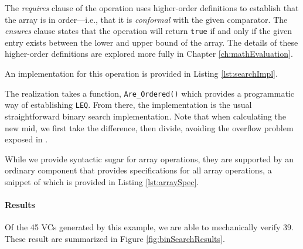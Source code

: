 The \emph{requires} clause of the operation uses higher-order definitions to establish that the array is in order---i.e., that it is \emph{conformal} with the given comparator.  The \emph{ensures} clause states that the operation will return \texttt{true} if and only if the given entry exists between the lower and upper bound of the array.  The details of these higher-order definitions are explored more fully in Chapter \ref{ch:mathEvaluation}.

An implementation for this operation is provided in Listing \ref{lst:searchImpl}.



The realization takes a function, \texttt{Are\_Ordered()} which provides a programmatic way of establishing \texttt{LEQ}.  From there, the implementation is the usual straightforward binary search implementation.  Note that when calculating the new mid, we first take the difference, then divide, avoiding the overflow problem exposed in \cite{blochBinarySearch}.

While we provide syntactic sugar for array operations, they are supported by an ordinary component that provides specifications for all array operations, a snippet of which is provided in Listing \ref{lst:arraySpec}.



\paragraph{Results} Of the 45 VCs generated by this example, we are able to mechanically verify 39.  These result are summarized in Figure \ref{fig:binSearchResults}.

